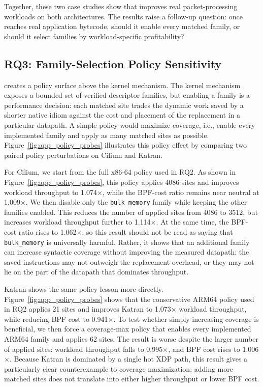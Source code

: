 Together, these two case studies show that \lang improves real packet-processing workloads on both architectures. The results raise a follow-up question: once \lang reaches real application bytecode, should it enable every matched family, or should it select families by workload-specific profitability?





\subsection{RQ3: Family-Selection Policy Sensitivity}
\label{subsec:policy_sensitivity}


\lang creates a policy surface above the \tool kernel mechanism. The kernel mechanism exposes a bounded set of verified descriptor families, but enabling a family is a performance decision: each matched site trades the dynamic work saved by a shorter native idiom against the cost and placement of the replacement in a particular datapath. A simple policy would maximize coverage, i.e., enable every implemented family and apply as many matched sites as possible. Figure~\ref{fig:app_policy_probes} illustrates this policy effect by comparing two paired policy perturbations on Cilium and Katran.



For Cilium, we start from the full x86-64 \lang policy used in RQ2. As shown in Figure~\ref{fig:app_policy_probes}, this policy applies 4086 sites and improves workload throughput to 1.074$\times$, while the BPF-cost ratio remains near neutral at 1.009$\times$. We then disable only the \texttt{bulk\_memory} family while keeping the other \lang families enabled. This reduces the number of applied sites from 4086 to 3512, but increases workload throughput further to 1.114$\times$. At the same time, the BPF-cost ratio rises to 1.062$\times$, so this result should not be read as saying that \texttt{bulk\_memory} is universally harmful. Rather, it shows that an additional family can increase syntactic coverage without improving the measured datapath: the saved instructions may not outweigh the replacement overhead, or they may not lie on the part of the datapath that dominates throughput.

Katran shows the same policy lesson more directly. Figure~\ref{fig:app_policy_probes} shows that the conservative ARM64 policy used in RQ2 applies 21 sites and improves Katran to 1.073$\times$ workload throughput, while reducing BPF cost to 0.941$\times$. To test whether simply increasing coverage is beneficial, we then force a coverage-max policy that enables every implemented ARM64 family and applies 62 sites. The result is worse despite the larger number of applied sites: workload throughput falls to 0.995$\times$, and BPF cost rises to 1.006$\times$. Because Katran is dominated by a single hot XDP path, this result gives a particularly clear counterexample to coverage maximization: adding more matched sites does not translate into either higher throughput or lower BPF cost.

